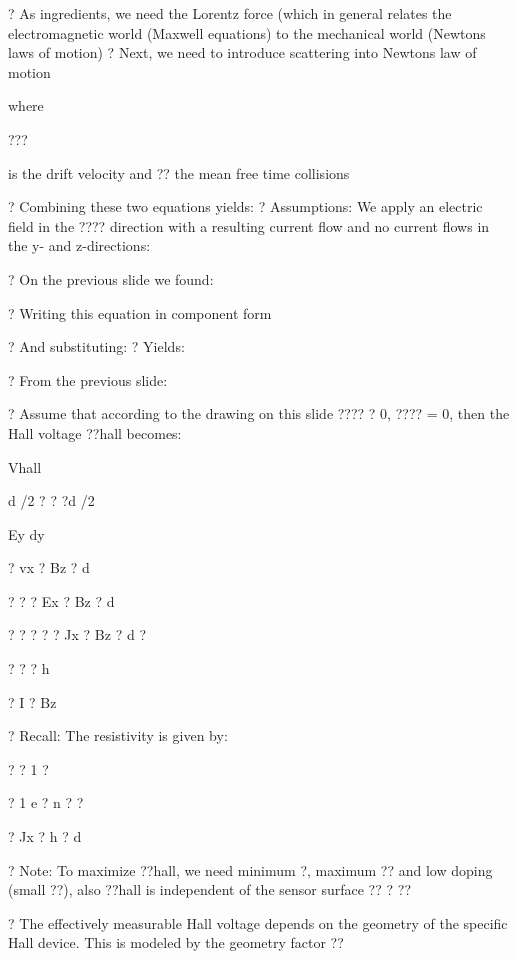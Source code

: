 \documentclass[2pt,landscape]{article}
\begin{document}
\begin{multicols*}{5}
?	As ingredients, we need the Lorentz force (which in general relates 
the electromagnetic world (Maxwell equations) to the mechanical world 
(Newton\textbullet s laws of motion)
?	Next, we need to introduce scattering into Newton\textbullet s law of motion




where


???


is the drift 
velocity and 
?? the mean 
free time 
collisions


?	Combining these two equations yields:
?	Assumptions: We apply an electric field in the ???? direction with a 
resulting current flow and no current flows in the y- and z-directions:





?	On the previous slide we found:


?	Writing this equation in component form




?	And substituting:
?	Yields:




?	From the previous slide:




?	Assume that according to the drawing on this slide ???? ? 0, ???? = 0, then 
the Hall voltage ??hall becomes:


Vhall


d /2 
?	?
?d /2 


Ey dy


? vx ? Bz ? d


? ? ? Ex ? Bz ? d


? ? ? ? ? Jx ? Bz ? d ?


? ? ?
h


? I ? Bz






?	Recall: The resistivity is given by:


? ? 1
?


?	1	
e ? n ? ?


? Jx ? h ? d





?	Note: To maximize ??hall, we need minimum ?, maximum ?? and low 
doping (small ??), also ??hall is independent of the sensor surface ?? ? ??



?	The effectively measurable Hall voltage depends on the geometry of 
the specific Hall device. This is modeled by the geometry factor ??





\end{multicols*}
\end{document}
